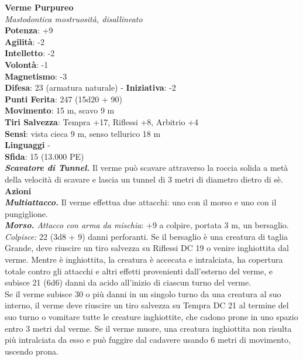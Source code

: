 \begin{multicols}{2}
\medskip\textbf{Verme Purpureo}\\
\emph{Mastodontica mostruosità, disallineato}\\
\textbf{Potenza}: +9\\
\textbf{Agilità}: -2\\
\textbf{Intelletto}: -2\\
\textbf{Volontà}: -1\\
\textbf{Magnetismo}: -3\\
\textbf{Difesa}: 23 (armatura naturale) - \textbf{Iniziativa}: -2\\
\textbf{Punti Ferita}: 247 (15d20 + 90)\\
\textbf{Movimento}: 15 m, scavo 9 m\\
\textbf{Tiri Salvezza}: Tempra +17, Riflessi +8, Arbitrio +4\\
\textbf{Sensi}: vista cieca 9 m, senso tellurico 18 m\\
\textbf{Linguaggi} -\\
\textbf{Sfida}: 15 (13.000 PE)\smallskip\\
\emph{\textbf{Scavatore di Tunnel.}} Il verme può scavare attraverso la roccia solida a metà della velocità di scavare e lascia un tunnel di 3 metri di diametro dietro di sè.\\
\smallskip\textbf{Azioni}\\
\emph{\textbf{Multiattacco.}} Il verme effettua due attacchi: uno con il morso e uno con il pungiglione.\\
\emph{\textbf{Morso.} Attacco con arma da mischia}: +9 a colpire, portata 3 m, un bersaglio.\\
\emph{Colpisce:} 22 (3d8 + 9) danni perforanti. Se il bersaglio è una creatura di taglia Grande, deve riuscire un tiro salvezza su Riflessi DC 19 o venire inghiottita dal verme. Mentre è inghiottita, la creatura è accecata e intralciata, ha copertura totale contro gli attacchi e altri effetti provenienti dall'esterno del verme, e subisce 21 (6d6) danni da acido all'inizio di ciascun turno del verme.\\
Se il verme subisce 30 o più danni in un singolo turno da una creatura al suo interno, il verme deve riuscire un tiro salvezza su Tempra DC 21 al termine del suo turno o vomitare tutte le creature inghiottite, che cadono prone in uno spazio entro 3 metri dal verme. Se il verme muore, una creatura inghiottita non risulta più intralciata da esso e può fuggire dal cadavere usando 6 metri di movimento, uscendo prona.\\


\end{multicols}

